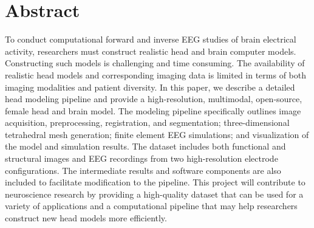 %

\section*{Abstract}

To conduct computational forward and inverse EEG studies of brain electrical activity, researchers must construct realistic head and brain computer models. Constructing such models is challenging and time consuming. The availability of realistic head models and corresponding imaging data is limited in terms of both imaging modalities and patient diversity. In this paper, we describe a detailed head modeling pipeline and provide a high-resolution, multimodal, open-source, female head and brain model. The modeling pipeline specifically outlines image acquisition, preprocessing, registration, and segmentation; three-dimensional tetrahedral mesh generation; finite element EEG simulations; and visualization of the model and simulation results. The dataset includes both functional and structural images and EEG recordings from two high-resolution electrode configurations. The intermediate results and software components are also included to facilitate modification to the pipeline. This project will contribute to neuroscience research by providing a high-quality dataset that can be used for a variety of applications and a computational pipeline that may help researchers construct new head models more efficiently.